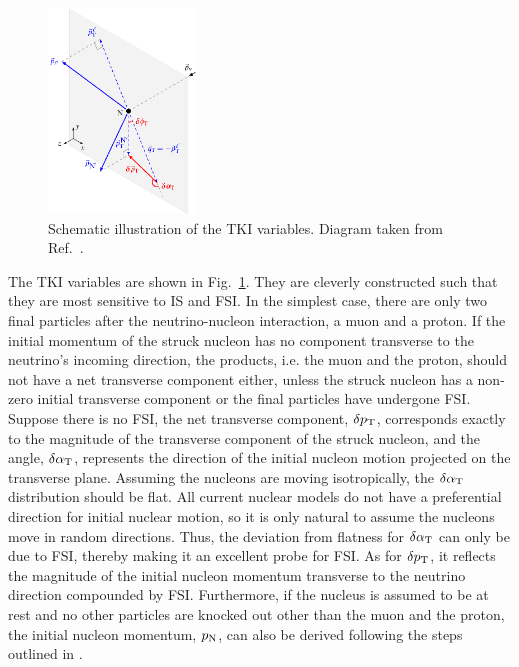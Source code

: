 \begin{figure}[!htb] 	
    \centering 		
    \includegraphics[width=0.35\textwidth]{figures/stki.eps}
    \caption{\label{fig:stki} Schematic illustration of the TKI variables. Diagram taken from Ref.~\cite{Lu:2015tcr}.} 
\end{figure}

The TKI variables are shown in Fig.~\ref{fig:stki}. They are cleverly constructed such that they are most sensitive to IS and FSI. 
In the simplest case, there are only two final particles after the neutrino-nucleon interaction, a muon and a proton. 
If the initial momentum of the struck nucleon has no component transverse to the neutrino's incoming direction, the products, i.e. the muon and the proton, should not have a net transverse component either, unless the struck nucleon has a non-zero initial transverse component or the final particles have undergone FSI.
Suppose there is no FSI, the net transverse component, $\delta p_\textrm{T}$, corresponds exactly to the magnitude of the transverse component of the struck nucleon, and the angle, $\delta\alpha_\textrm{T}$, represents the direction of the initial nucleon motion projected on the transverse plane. 
Assuming the nucleons are moving isotropically, the $\delta\alpha_\textrm{T}$ distribution should be flat. 
All current nuclear models do not have a preferential direction for initial nuclear motion, so it is only natural to assume the nucleons move in random directions. 
Thus, the deviation from flatness for $\delta\alpha_\textrm{T}$ can only be due to FSI, thereby making it an excellent probe for FSI. 
As for $\delta p_\textrm{T}$, it reflects the magnitude of the initial nucleon momentum transverse to the neutrino direction compounded by FSI. 
Furthermore, if the nucleus is assumed to be at rest and no other particles are knocked out other than the muon and the proton, the initial nucleon momentum, $p_\textrm{N}$, can also be derived following the steps outlined in \cite{pnpaper}. 
 

